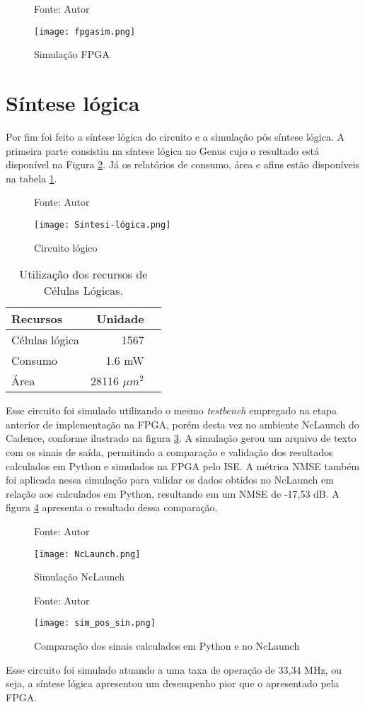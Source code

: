 \begin{figure}[htbp!]
	\centering
	\captionsetup{justification=centering}
	\caption*{Fonte: Autor}
	\texttt{[image: fpgasim.png]}
	\caption{Simulação FPGA}
	\label{fig:simfpga}
\end{figure}


\section{Síntese lógica}
Por fim foi feito a síntese lógica do circuito e a simulação pós síntese lógica. A primeira parte consistiu na síntese lógica no Genus cujo o resultado está disponível na Figura \ref{fig:circuito_logico}. Já os relatórios de consumo, área e afins estão disponíveis na tabela \ref{tab:recursos_sintese}. 

\begin{figure}[htbp!]
	\centering
	\captionsetup{justification=centering}
	\caption*{Fonte: Autor}
	\texttt{[image: Sintesi-lógica.png]}
	\caption{Circuito lógico}
	\label{fig:circuito_logico}
\end{figure}

\begin{table}[htbp!]
	\centering
	\begin{tabular}{|l|r|r|}
		\hline
		Recursos & Unidade  \\
		\hline
        Células lógica & 1567  \\
		Consumo & 1.6 mW  \\
		Área & 28116 $ \mu m^2$  \\
		\hline
	\end{tabular}
	\caption{Utilização dos recursos de Células Lógicas.}
	\label{tab:recursos_sintese}
\end{table}

Esse circuito foi simulado utilizando o mesmo \textit{testbench} empregado na etapa anterior de implementação na FPGA, porém desta vez no ambiente NcLaunch do Cadence, conforme ilustrado na figura \ref{fig:NcLaunch}. A simulação gerou um arquivo de texto com os sinais de saída, permitindo a comparação e validação dos resultados calculados em Python e simulados na FPGA pelo ISE. A métrica NMSE também foi aplicada nessa simulação para validar os dados obtidos no NcLaunch em relação aos calculados em Python, resultando em um NMSE de -17,53 dB. A figura \ref{fig:simpost} apresenta o resultado dessa comparação.


\begin{figure}[htbp!]
	\centering
	\captionsetup{justification=centering}
	\caption*{Fonte: Autor}
	\texttt{[image: NcLaunch.png]}
	\caption{Simulação NcLaunch}
	\label{fig:NcLaunch}
\end{figure}


\begin{figure}[htbp!]
	\centering
	\captionsetup{justification=centering}
	\caption*{Fonte: Autor}
	\texttt{[image: sim\_pos\_sin.png]}
	\caption{Comparação dos sinais calculados em Python e no NcLaunch} 
	\label{fig:simpost}
\end{figure}

Esse circuito foi simulado atuando a uma taxa de operação de 33,34 MHz, ou seja, a síntese lógica apresentou um desempenho pior que o apresentado pela FPGA. 